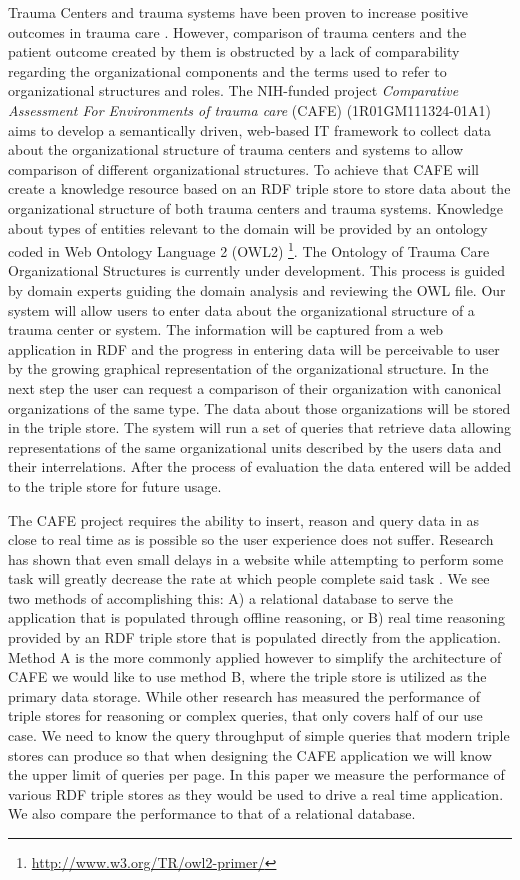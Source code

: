 \documentclass{llncs}
\begin{document}
Trauma Centers and trauma systems have been proven to increase positive outcomes in trauma care \cite{pmid16427544, pmid21206286, pmid26151508}. However, comparison of trauma centers and the patient outcome created by them is obstructed by a lack of comparability regarding the organizational components and the terms used to refer to organizational structures and roles. The NIH-funded project \textit{Comparative Assessment For Environments of trauma care} (CAFE) (1R01GM111324-01A1) aims to develop a semantically driven, web-based IT framework to collect data about the organizational structure of trauma centers and systems to allow comparison of different organizational structures. To achieve that CAFE will create a knowledge resource based on an RDF triple store to store data about the organizational structure of both trauma centers and trauma systems. Knowledge about types of entities relevant to the domain will be provided by an ontology coded in Web Ontology Language 2 (OWL2) \footnote{\url{http://www.w3.org/TR/owl2-primer/}}. The Ontology of Trauma Care Organizational Structures is currently under development. This process is guided by domain experts guiding the domain analysis and reviewing the OWL file. Our system will allow users to enter data about the organizational structure of a trauma center or system. The information will be captured from a web application in RDF and the progress in entering data will be perceivable to user by the growing graphical representation of the organizational structure. In the next step the user can request a comparison of their organization with canonical organizations of the same type. The data about those organizations will be stored in the triple store. The system will run a set of queries that retrieve data allowing representations of the same organizational units described by the users data and their interrelations. After the process of evaluation the data entered will be added to the triple store for future usage.

The CAFE project requires the ability to insert, reason and query data in as close to real time as is possible so the user experience does not suffer. Research has shown that even small delays in a website while attempting to perform some task will greatly decrease the rate at which people complete said task \cite{Galletta2002}.  We see two methods of accomplishing this: A) a relational database to serve the application that is populated through offline reasoning, or B) real time reasoning provided by an RDF triple store that is populated directly from the application. Method A is the more commonly applied however to simplify the architecture of CAFE we would like to use method B, where the triple store is utilized as the primary data storage. While other research has measured the performance of triple stores for reasoning or complex queries, that only covers half of our use case.  We need to know the query throughput of simple queries that modern triple stores can produce so that when designing the CAFE application we will know the upper limit of queries per page. In this paper we measure the performance of various RDF triple stores as they would be used to drive a real time application. We also compare the performance to that of a relational database.
\end{document}
